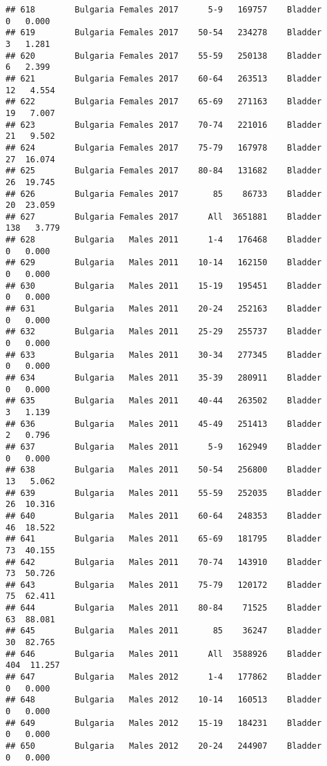 \documentclass[
]{article}
\begin{document}
\begin{verbatim}
## 618        Bulgaria Females 2017      5-9   169757    Bladder      0   0.000
## 619        Bulgaria Females 2017    50-54   234278    Bladder      3   1.281
## 620        Bulgaria Females 2017    55-59   250138    Bladder      6   2.399
## 621        Bulgaria Females 2017    60-64   263513    Bladder     12   4.554
## 622        Bulgaria Females 2017    65-69   271163    Bladder     19   7.007
## 623        Bulgaria Females 2017    70-74   221016    Bladder     21   9.502
## 624        Bulgaria Females 2017    75-79   167978    Bladder     27  16.074
## 625        Bulgaria Females 2017    80-84   131682    Bladder     26  19.745
## 626        Bulgaria Females 2017       85    86733    Bladder     20  23.059
## 627        Bulgaria Females 2017      All  3651881    Bladder    138   3.779
## 628        Bulgaria   Males 2011      1-4   176468    Bladder      0   0.000
## 629        Bulgaria   Males 2011    10-14   162150    Bladder      0   0.000
## 630        Bulgaria   Males 2011    15-19   195451    Bladder      0   0.000
## 631        Bulgaria   Males 2011    20-24   252163    Bladder      0   0.000
## 632        Bulgaria   Males 2011    25-29   255737    Bladder      0   0.000
## 633        Bulgaria   Males 2011    30-34   277345    Bladder      0   0.000
## 634        Bulgaria   Males 2011    35-39   280911    Bladder      0   0.000
## 635        Bulgaria   Males 2011    40-44   263502    Bladder      3   1.139
## 636        Bulgaria   Males 2011    45-49   251413    Bladder      2   0.796
## 637        Bulgaria   Males 2011      5-9   162949    Bladder      0   0.000
## 638        Bulgaria   Males 2011    50-54   256800    Bladder     13   5.062
## 639        Bulgaria   Males 2011    55-59   252035    Bladder     26  10.316
## 640        Bulgaria   Males 2011    60-64   248353    Bladder     46  18.522
## 641        Bulgaria   Males 2011    65-69   181795    Bladder     73  40.155
## 642        Bulgaria   Males 2011    70-74   143910    Bladder     73  50.726
## 643        Bulgaria   Males 2011    75-79   120172    Bladder     75  62.411
## 644        Bulgaria   Males 2011    80-84    71525    Bladder     63  88.081
## 645        Bulgaria   Males 2011       85    36247    Bladder     30  82.765
## 646        Bulgaria   Males 2011      All  3588926    Bladder    404  11.257
## 647        Bulgaria   Males 2012      1-4   177862    Bladder      0   0.000
## 648        Bulgaria   Males 2012    10-14   160513    Bladder      0   0.000
## 649        Bulgaria   Males 2012    15-19   184231    Bladder      0   0.000
## 650        Bulgaria   Males 2012    20-24   244907    Bladder      0   0.000

\end{verbatim}
\end{document}
